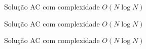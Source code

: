\begin{frame}[fragile]{Solução AC com complexidade $O(N\log N)$}
\end{frame}

\begin{frame}[fragile]{Solução AC com complexidade $O(N\log N)$}
\end{frame}

\begin{frame}[fragile]{Solução AC com complexidade $O(N\log N)$}
\end{frame}
